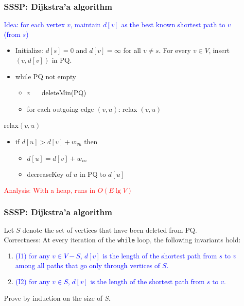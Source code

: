   \begin{frame}[fragile]
  \frametitle{SSSP: Dijkstra'a algorithm}

\textcolor{blue}{Idea: for each vertex $v$, maintain $d[v]$ as the best known shortest path to $v$ (from $s$)}

 
\begin{itemize} 
\item  Initialize: $d[s]=0$ and  $d[v] = \infty$ for all $v \neq s$. For every $v \in V$, insert $(v,d[v])$ in PQ. 

\item while PQ not empty 
  \begin{itemize}
  \item $v  = $ deleteMin(PQ) 
  \item for each outgoing edge $(v,u)$: relax $(v,u)$
  \end{itemize} 
\end{itemize} 


relax$(v,u)$
\begin{itemize} 
\item if $d[u] > d[v]+w_{vu}$ then 
  \begin{itemize}
  \item $d[u] = d[v]+w_{vu}$ 
  \item decreaseKey of $u$ in PQ to $d[u]$
  \end{itemize} 
\end{itemize} 
\textcolor{red}{Analysis:   With a heap, runs in $O(E \lg V)$}
\end{frame}




  \begin{frame}[fragile]
  \frametitle{SSSP: Dijkstra'a algorithm}
Let $S$ denote the set of vertices that have been deleted from PQ. \\
Correctness: At every iteration of the \texttt{while} loop, the following invariants hold: 
\\
\begin{enumerate} 
\item \textcolor{blue}{(I1) for any $v \in V-S$, $d[v]$ is the length of the shortest
  path from $s$ to $v$ among all paths that go only through vertices
  of $S$.}
\item \textcolor{blue} {(I2) for any $v \in S$, $d[v]$ is the length of the shortest path from $s$ to $v$. }
\end{enumerate}

Prove by induction on the size of $S$. 
\end{frame} 



